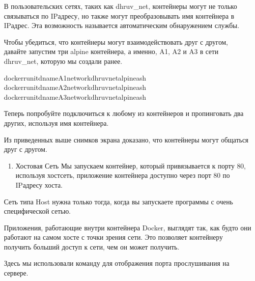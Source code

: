 \documentclass[letterpaper,10pt,russian]{sphinxmanual}
\begin{document}
\sphinxAtStartPar
В пользовательских сетях, таких как dhruv\_net, контейнеры могут не только связываться по IP\sphinxhyphen{}адресу, но также могут преобразовывать имя контейнера в IP\sphinxhyphen{}адрес. Эта возможность называется автоматическим обнаружением службы.

\sphinxAtStartPar
Чтобы убедиться, что контейнеры могут взаимодействовать друг с другом, давайте запустим три alpine контейнера, а именно, A1, A2 и A3 в сети dhruv\_net, которую мы создали ранее.

\begin{sphinxVerbatim}[commandchars=\\\{\}]
dockerrun\PYGZhy{}it\PYGZhy{}d\PYGZhy{}\PYGZhy{}nameA1\PYGZhy{}\PYGZhy{}networkdhruv\PYGZus{}netalpineash
dockerrun\PYGZhy{}it\PYGZhy{}d\PYGZhy{}\PYGZhy{}nameA2\PYGZhy{}\PYGZhy{}networkdhruv\PYGZus{}netalpineash
dockerrun\PYGZhy{}it\PYGZhy{}d\PYGZhy{}\PYGZhy{}nameA3\PYGZhy{}\PYGZhy{}networkdhruv\PYGZus{}netalpineash
\end{sphinxVerbatim}

\sphinxAtStartPar
Теперь попробуйте подключиться к любому из контейнеров и пропинговать два других, используя имя контейнера.

\sphinxAtStartPar
Из приведенных выше снимков экрана доказано, что контейнеры могут общаться друг с другом.
\begin{enumerate}
%
\setcounter{enumi}{1}
\item {} 
\sphinxAtStartPar
Хостовая Сеть
Мы запускаем контейнер, который привязывается к порту 80, используя хост\sphinxhyphen{}сеть, приложение контейнера доступно через порт 80 по IP\sphinxhyphen{}адресу хоста.

\end{enumerate}

\sphinxAtStartPar
Сеть типа Host нужна только тогда, когда вы запускаете программы с очень специфической сетью.

\sphinxAtStartPar
Приложения, работающие внутри контейнера Docker, выглядят так, как будто они работают на самом хосте с точки зрения сети.
Это позволяет контейнеру получить больший доступ к сети, чем он может получить.

\sphinxAtStartPar
Здесь мы использовали команду  для отображения порта прослушивания на сервере.
\end{document}
